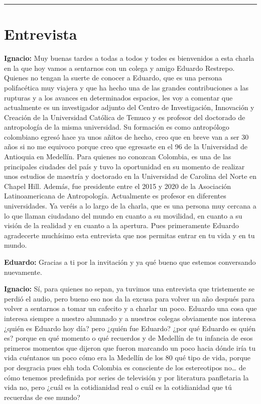 \documentclass[
]{interact}
\begin{document}
\begin{center}\rule{0.5\linewidth}{0.5pt}\end{center}

\section{Entrevista}\label{entrevista}

\textbf{Ignacio:} Muy buenas tardes a todas a todos y todes es
bienvenidos a esta charla en la que hoy vamos a sentarnos con un colega
y amigo Eduardo Restrepo. Quienes no tengan la suerte de conocer a
Eduardo, que es una persona polifacética muy viajera y que ha hecho una
de las grandes contribuciones a las rupturas y a los avances en
determinados espacios, les voy a comentar que actualmente es un
investigador adjunto del Centro de Investigación, Innovación y Creación
de la Universidad Católica de Temuco y es profesor del doctorado de
antropología de la misma universidad. Su formación es como antropólogo
colombiano egresó hace ya unos añitos de hecho, creo que en breve van a
ser 30 años si no me equivoco porque creo que egresaste en el 96 de la
Universidad de Antioquia en Medellín. Para quienes no conozcan Colombia,
es una de las principales ciudades del país y tuvo la oportunidad en su
momento de realizar unos estudios de maestría y doctorado en la
Universidad de Carolina del Norte en Chapel Hill. Además, fue presidente
entre el 2015 y 2020 de la Asociación Latinoamericana de Antropología.
Actualmente es profesor en diferentes universidades. Ya veréis a lo
largo de la charla, que es una persona muy cercana a lo que llaman
ciudadano del mundo en cuanto a su movilidad, en cuanto a su visión de
la realidad y en cuanto a la apertura. Pues primeramente Eduardo
agradecerte muchísimo esta entrevista que nos permitas entrar en tu vida
y en tu mundo.

\textbf{Eduardo:} Gracias a ti por la invitación y ya qué bueno que
estemos conversando nuevamente.

\textbf{Ignacio:} Sí, para quienes no sepan, ya tuvimos una entrevista
que tristemente se perdió el audio, pero bueno eso nos da la excusa para
volver un año después para volver a sentarnos a tomar un cafecito y a
charlar un poco. Eduardo una cosa que interesa siempre a nuestro
alumnado y a nuestros colegas obviamente nos interesa ¿quién es Eduardo
hoy día? pero ¿quién fue Eduardo? ¿por qué Eduardo es quién es? porque
en qué momento o qué recuerdos y de Medellín de tu infancia de esos
primeros momentos que dijeron que fueron marcando un poco hacia dónde
iría tu vida cuéntanos un poco cómo era la Medellín de los 80 qué tipo
de vida, porque por desgracia pues ehh toda Colombia es consciente de
los estereotipos no\ldots{} de cómo tenemos predefinida por series de
televisión y por literatura panfletaria la vida no, pero ¿cuál es la
cotidianidad real o cuál es la cotidianidad que tú recuerdas de ese
mundo?
\end{document}
